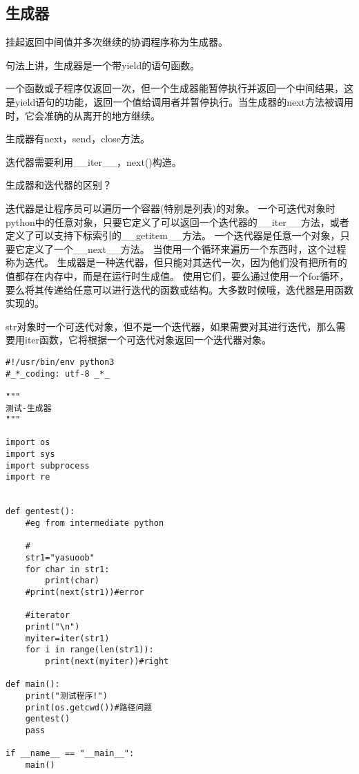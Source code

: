 \documentclass[twoside,11pt]{book}
\begin{document}
\subsection{生成器}

挂起返回中间值并多次继续的协调程序称为生成器。

句法上讲，生成器是一个带yield的语句函数。

一个函数或子程序仅返回一次，但一个生成器能暂停执行并返回一个中间结果，这是yield语句的功能，返回一个值给调用者并暂停执行。当生成器的next方法被调用时，它会准确的从离开的地方继续。

生成器有next，send，close方法。

迭代器需要利用\_\_iter\_\_，next()构造。


生成器和迭代器的区别？

迭代器是让程序员可以遍历一个容器(特别是列表)的对象。
一个可迭代对象时python中的任意对象，只要它定义了可以返回一个迭代器的\_\_iter\_\_方法，或者定义了可以支持下标索引的\_\_getitem\_\_方法。
一个迭代器是任意一个对象，只要它定义了一个\_\_next\_\_方法。
当使用一个循环来遍历一个东西时，这个过程称为迭代。
生成器是一种迭代器，但只能对其迭代一次，因为他们没有把所有的值都存在内存中，而是在运行时生成值。
使用它们，要么通过使用一个for循环，要么将其传递给任意可以进行迭代的函数或结构。大多数时候哦，迭代器是用函数实现的。

str对象时一个可迭代对象，但不是一个迭代器，如果需要对其进行迭代，那么需要用iter函数，它将根据一个可迭代对象返回一个迭代器对象。

\begin{lstlisting}
#!/usr/bin/env python3
#_*_coding: utf-8 _*_

"""
测试-生成器
"""

import os
import sys
import subprocess
import re


def gentest():
    #eg from intermediate python

    #
    str1="yasuoob"
    for char in str1:
        print(char)
    #print(next(str1))#error

    #iterator
    print("\n")
    myiter=iter(str1)
    for i in range(len(str1)):
        print(next(myiter))#right

def main():
    print("测试程序!")
    print(os.getcwd())#路径问题
    gentest()
    pass

if __name__ == "__main__":
    main()
\end{lstlisting}
\end{document}
